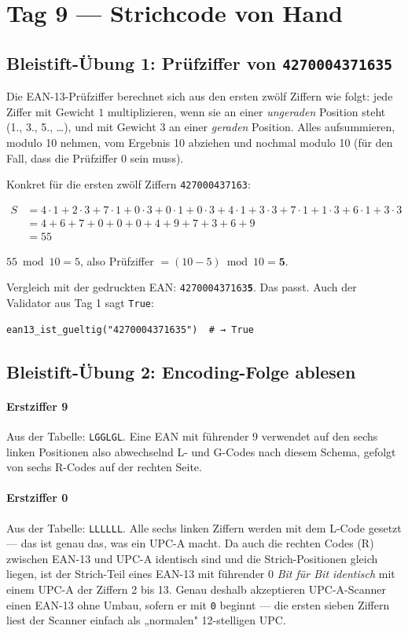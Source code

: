\section*{Tag 9 — Strichcode von Hand}

\subsection*{Bleistift-Übung 1: Prüfziffer von \texttt{4270004371635}}

Die EAN-13-Prüfziffer berechnet sich aus den ersten zwölf Ziffern wie
folgt: jede Ziffer mit Gewicht $1$ multiplizieren, wenn sie an einer
\emph{ungeraden} Position steht (1., 3., 5., \dots), und mit Gewicht
$3$ an einer \emph{geraden} Position. Alles aufsummieren, modulo 10
nehmen, vom Ergebnis 10 abziehen und nochmal modulo 10 (für den Fall,
dass die Prüfziffer 0 sein muss).

Konkret für die ersten zwölf Ziffern \texttt{427000437163}:

\begin{align*}
S &= 4{\cdot}1 + 2{\cdot}3 + 7{\cdot}1 + 0{\cdot}3 + 0{\cdot}1 + 0{\cdot}3
   + 4{\cdot}1 + 3{\cdot}3 + 7{\cdot}1 + 1{\cdot}3 + 6{\cdot}1 + 3{\cdot}3 \\
  &= 4 + 6 + 7 + 0 + 0 + 0 + 4 + 9 + 7 + 3 + 6 + 9 \\
  &= 55
\end{align*}

$55 \bmod 10 = 5$, also Prüfziffer
$= (10 - 5) \bmod 10 = \mathbf{5}$.

Vergleich mit der gedruckten EAN: \texttt{427000437163\textbf{5}}. Das
passt. Auch der Validator aus Tag 1 sagt \texttt{True}:

\begin{verbatim}
ean13_ist_gueltig("4270004371635")  # → True
\end{verbatim}

\subsection*{Bleistift-Übung 2: Encoding-Folge ablesen}

\paragraph{Erstziffer 9} Aus der Tabelle: \texttt{LGGLGL}. Eine
EAN mit führender 9 verwendet auf den sechs linken Positionen also
abwechselnd L- und G-Codes nach diesem Schema, gefolgt von sechs
R-Codes auf der rechten Seite.

\paragraph{Erstziffer 0} Aus der Tabelle: \texttt{LLLLLL}. Alle
sechs linken Ziffern werden mit dem L-Code gesetzt — das ist genau
das, was ein UPC-A macht. Da auch die rechten Codes (R) zwischen
EAN-13 und UPC-A identisch sind und die Strich-Positionen gleich
liegen, ist der Strich-Teil eines EAN-13 mit führender 0 \emph{Bit
für Bit identisch} mit einem UPC-A der Ziffern 2 bis 13. Genau
deshalb akzeptieren UPC-A-Scanner einen EAN-13 ohne Umbau, sofern
er mit \texttt{0} beginnt — die ersten sieben Ziffern liest der
Scanner einfach als „normalen" 12-stelligen UPC.
